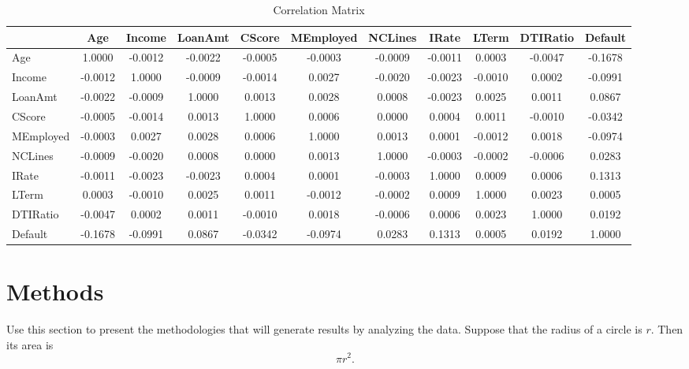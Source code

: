 \documentclass[12pt]{article}
\begin{document}
\begin{table}[htbp]
    \centering
    \caption{Correlation Matrix}
    \small
    \begin{adjustbox}{width=\textwidth}
    \begin{tabular}{l*{10}{@{\extracolsep{4pt}}c}}
        \toprule
        & Age & Income & LoanAmt & CScore & MEmployed & NCLines & IRate & LTerm & DTIRatio & Default \\
        \midrule
        Age & 1.0000 & -0.0012 & -0.0022 & -0.0005 & -0.0003 & -0.0009 & -0.0011 & 0.0003 & -0.0047 & -0.1678 \\
        Income & -0.0012 & 1.0000 & -0.0009 & -0.0014 & 0.0027 & -0.0020 & -0.0023 & -0.0010 & 0.0002 & -0.0991 \\
        LoanAmt & -0.0022 & -0.0009 & 1.0000 & 0.0013 & 0.0028 & 0.0008 & -0.0023 & 0.0025 & 0.0011 & 0.0867 \\
        CScore & -0.0005 & -0.0014 & 0.0013 & 1.0000 & 0.0006 & 0.0000 & 0.0004 & 0.0011 & -0.0010 & -0.0342 \\
        MEmployed & -0.0003 & 0.0027 & 0.0028 & 0.0006 & 1.0000 & 0.0013 & 0.0001 & -0.0012 & 0.0018 & -0.0974 \\
        NCLines & -0.0009 & -0.0020 & 0.0008 & 0.0000 & 0.0013 & 1.0000 & -0.0003 & -0.0002 & -0.0006 & 0.0283 \\
        IRate & -0.0011 & -0.0023 & -0.0023 & 0.0004 & 0.0001 & -0.0003 & 1.0000 & 0.0009 & 0.0006 & 0.1313 \\
        LTerm & 0.0003 & -0.0010 & 0.0025 & 0.0011 & -0.0012 & -0.0002 & 0.0009 & 1.0000 & 0.0023 & 0.0005 \\
        DTIRatio & -0.0047 & 0.0002 & 0.0011 & -0.0010 & 0.0018 & -0.0006 & 0.0006 & 0.0023 & 1.0000 & 0.0192 \\
        Default & -0.1678 & -0.0991 & 0.0867 & -0.0342 & -0.0974 & 0.0283 & 0.1313 & 0.0005 & 0.0192 & 1.0000 \\
        \bottomrule
    \end{tabular}
    \end{adjustbox}
\end{table}


\section{Methods}
\label{sec:meth}

Use this section to present the methodologies that will generate results by
analyzing the data. Suppose that the radius of a circle is $r$. Then its area is
\begin{equation}
  \label{eq:area}
  \pi r^2.
\end{equation}
\end{document}
